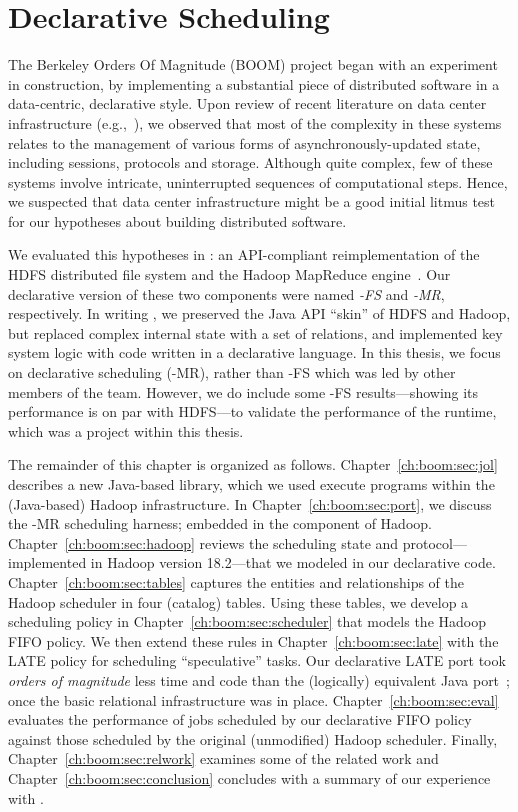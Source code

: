 \chapter[Declarative Scheduling]{Declarative Scheduling}
\label{ch:boom}

The Berkeley Orders Of Magnitude (BOOM) project began with an experiment in
construction, by implementing a substantial piece of distributed software in a
data-centric, declarative style.  Upon review of recent literature on
data center infrastructure (e.g.,~\cite{chubby,gfs-sosp,dynamo,mapreduce-osdi}),
we observed that most of the complexity in these systems relates to the
management of various forms of asynchronously-updated state, including
sessions, protocols and storage.  Although quite complex, few of these systems
involve intricate, uninterrupted sequences of computational steps.  Hence, we
suspected that data center infrastructure might be a good initial litmus test
for our hypotheses about building distributed software.

We evaluated this hypotheses in {\em \BOOMA}: an API-compliant reimplementation
of the HDFS distributed file system and the Hadoop MapReduce
engine~\cite{boom}.  Our declarative version of these two components were named
{\em \BOOM-FS} and {\em \BOOM-MR}, respectively.  In writing \BOOMA, we
preserved the Java API ``skin'' of HDFS and Hadoop, but replaced complex
internal state with a set of relations, and implemented key system logic with
code written in a declarative language.  In this thesis, we focus on
declarative scheduling (\BOOM-MR), rather than \BOOM-FS which was led by other
members of the \BOOMA team.  However, we do include some \BOOM-FS
results---showing its performance is on par with HDFS---to validate the
performance of the \JOL runtime, which was a project within this thesis.

The remainder of this chapter is organized as follows.
Chapter~\ref{ch:boom:sec:jol} describes a new Java-based \OVERLOG library,
which we used execute \OVERLOG programs within the (Java-based) Hadoop
infrastructure.  In Chapter~\ref{ch:boom:sec:port}, we discuss the \BOOM-MR
scheduling harness; embedded in the \JT component of Hadoop.
Chapter~\ref{ch:boom:sec:hadoop} reviews the scheduling state and
protocol---implemented in Hadoop version 18.2---that we modeled in our
declarative code.  Chapter~\ref{ch:boom:sec:tables} captures the entities and
relationships of the Hadoop scheduler in four (catalog) tables.  Using these
tables, we develop a scheduling policy in Chapter~\ref{ch:boom:sec:scheduler}
that models the Hadoop FIFO policy.  We then extend these rules in
Chapter~\ref{ch:boom:sec:late} with the LATE policy for scheduling
``speculative'' tasks.  Our declarative LATE port took {\em orders of
magnitude} less time and code than the (logically) equivalent Java
port~\cite{jira-2141}; once the basic relational infrastructure was in place.
Chapter~\ref{ch:boom:sec:eval} evaluates the performance of jobs scheduled by
our declarative FIFO policy against those scheduled by the original
(unmodified) Hadoop scheduler.  Finally, Chapter~\ref{ch:boom:sec:relwork}
examines some of the related work and Chapter~\ref{ch:boom:sec:conclusion}
concludes with a summary of our experience with \BOOMA.

